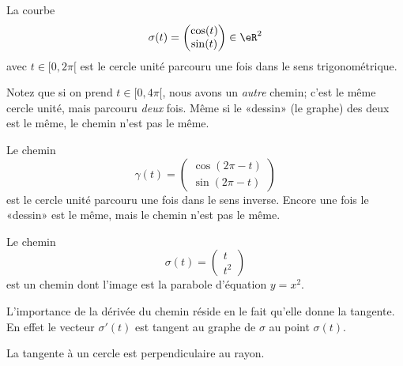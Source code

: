 \begin{example}
    La courbe
    \begin{equation}
        \sigma(t)=\begin{pmatrix}
            \cos(t)    \\ 
            \sin(t)    
        \end{pmatrix}\in\eR^2
    \end{equation}
    avec $t\in\mathopen[ 0 , 2\pi [$ est le cercle unité parcouru une fois dans le sens trigonométrique.

    Notez que si on prend $t\in\mathopen[ 0 , 4\pi [$, nous avons un \emph{autre} chemin; c'est le même cercle unité, mais parcouru \emph{deux} fois. Même si le «dessin» (le graphe) des deux est le même, le chemin n'est pas le même.

    Le chemin
    \begin{equation}
        \gamma(t)=\begin{pmatrix}
            \cos(2\pi-t)    \\ 
            \sin(2\pi-t)    
        \end{pmatrix}
    \end{equation}
    est le cercle unité parcouru une fois dans le sens inverse. Encore une fois le «dessin» est le même, mais le chemin n'est pas le même.
\end{example}

\begin{example}
    Le chemin
    \begin{equation}
        \sigma(t)=\begin{pmatrix}
            t    \\ 
            t^2    
        \end{pmatrix}
    \end{equation}
    est un chemin dont l'image est la parabole d'équation $y=x^2$.
\end{example}

L'importance de la dérivée du chemin réside en le fait qu'elle donne la tangente. En effet le vecteur $\sigma'(t)$ est tangent au graphe de $\sigma$ au point $\sigma(t)$.

\begin{corollary}       \label{CorKBEMooRvYAcJ}
    La tangente à un cercle est perpendiculaire au rayon.
\end{corollary}

